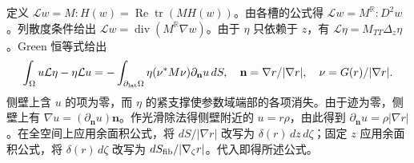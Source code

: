 定义 $\mathcal Lw=M:H(w)=\operatorname{Re}\operatorname{tr}(MH(w))$。由各槽的公式得 $\mathcal Lw=M^\mathbb R:D^2w$。列散度条件给出 $\mathcal Lw=\operatorname{div}(M^\mathbb R\nabla w)$。由于 $\eta$ 只依赖于 $z$，有 $\mathcal L\eta=M_{TT}\Delta_z\eta$。Green 恒等式给出
\[
\int_\Omega u\mathcal L\eta-\eta\mathcal Lu
=-\int_{\partial_{\rm lat}\Omega}\eta(\nu^*M\nu)\partial_{\mathbf n}u\,dS,
\quad
\mathbf n=\nabla r/|\nabla r|,\quad \nu=G(r)/|\nabla r|.
\]
侧壁上含 $u$ 的项为零，而 $\eta$ 的紧支撑使参数域端部的各项消失。由于迹为零，侧壁上有 $\nabla u=(\partial_{\mathbf n}u)\mathbf n$。作光滑除法得侧壁附近的 $u=r\rho$，由此得到 $\partial_{\mathbf n}u=\rho|\nabla r|$。在全空间上应用余面积公式，将 $dS/|\nabla r|$ 改写为 $\delta(r)\,dz\,d\zeta$；固定 $z$ 应用余面积公式，将 $\delta(r)\,d\zeta$ 改写为 $dS_{\rm fib}/|\nabla_\zeta r|$。代入即得所述公式。
